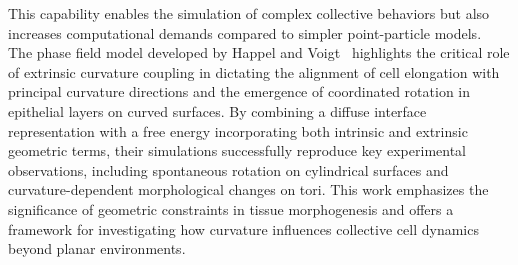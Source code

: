 This capability enables the simulation of complex collective behaviors but also increases computational demands compared to simpler point-particle models. \\
The phase field model developed by Happel and Voigt~\cite{Happel2023} highlights the critical role of extrinsic curvature coupling in dictating the alignment of cell elongation with principal curvature directions and the emergence of coordinated rotation in epithelial layers on curved surfaces. 
By combining a diffuse interface representation with a free energy incorporating both intrinsic and extrinsic geometric terms, their simulations successfully reproduce key experimental observations, including spontaneous rotation on cylindrical surfaces and curvature-dependent morphological changes on tori. 
This work emphasizes the significance of geometric constraints in tissue morphogenesis and offers a framework for investigating how curvature influences collective cell dynamics beyond planar environments. \\



